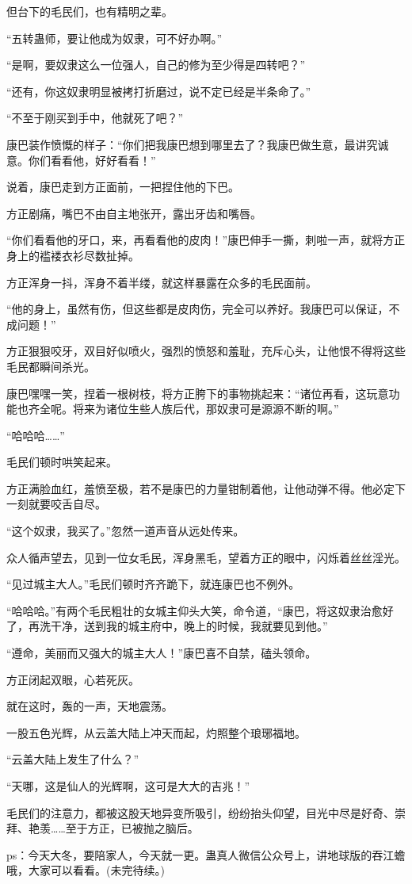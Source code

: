 \begin{this_body}
但台下的毛民们，也有精明之辈。

“五转蛊师，要让他成为奴隶，可不好办啊。”

“是啊，要奴隶这么一位强人，自己的修为至少得是四转吧？”

“还有，你这奴隶明显被拷打折磨过，说不定已经是半条命了。”

“不至于刚买到手中，他就死了吧？”

康巴装作愤慨的样子：“你们把我康巴想到哪里去了？我康巴做生意，最讲究诚意。你们看看他，好好看看！”

说着，康巴走到方正面前，一把捏住他的下巴。

方正剧痛，嘴巴不由自主地张开，露出牙齿和嘴唇。

“你们看看他的牙口，来，再看看他的皮肉！”康巴伸手一撕，刺啦一声，就将方正身上的褴褛衣衫尽数扯掉。

方正浑身一抖，浑身不着半缕，就这样暴露在众多的毛民面前。

“他的身上，虽然有伤，但这些都是皮肉伤，完全可以养好。我康巴可以保证，不成问题！”

方正狠狠咬牙，双目好似喷火，强烈的愤怒和羞耻，充斥心头，让他恨不得将这些毛民都瞬间杀光。

康巴嘿嘿一笑，捏着一根树枝，将方正胯下的事物挑起来：“诸位再看，这玩意功能也齐全呢。将来为诸位生些人族后代，那奴隶可是源源不断的啊。”

“哈哈哈……”

毛民们顿时哄笑起来。

方正满脸血红，羞愤至极，若不是康巴的力量钳制着他，让他动弹不得。他必定下一刻就要咬舌自尽。

“这个奴隶，我买了。”忽然一道声音从远处传来。

众人循声望去，见到一位女毛民，浑身黑毛，望着方正的眼中，闪烁着丝丝淫光。

“见过城主大人。”毛民们顿时齐齐跪下，就连康巴也不例外。

“哈哈哈。”有两个毛民粗壮的女城主仰头大笑，命令道，“康巴，将这奴隶治愈好了，再洗干净，送到我的城主府中，晚上的时候，我就要见到他。”

“遵命，美丽而又强大的城主大人！”康巴喜不自禁，磕头领命。

方正闭起双眼，心若死灰。

就在这时，轰的一声，天地震荡。

一股五色光辉，从云盖大陆上冲天而起，灼照整个琅琊福地。

“云盖大陆上发生了什么？”

“天哪，这是仙人的光辉啊，这可是大大的吉兆！”

毛民们的注意力，都被这股天地异变所吸引，纷纷抬头仰望，目光中尽是好奇、崇拜、艳羡……至于方正，已被抛之脑后。

ps：今天大冬，要陪家人，今天就一更。蛊真人微信公众号上，讲地球版的吞江蟾哦，大家可以看看。(未完待续。)

\end{this_body}

